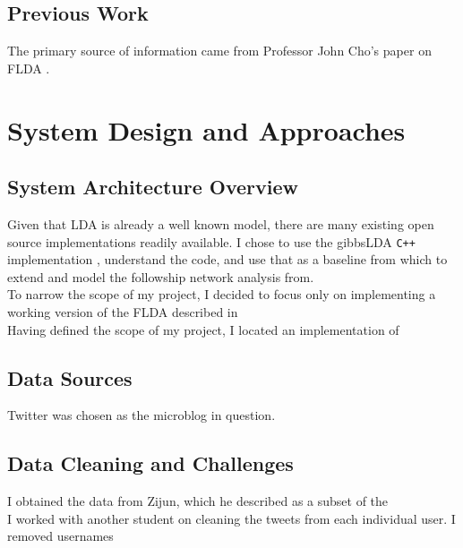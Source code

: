 \documentclass[a4paper]{article}
\begin{document}
\begin{multicols}{2}
\subsection{Previous Work}
The primary source of information came from Professor John Cho's paper on FLDA \cite{flda}.  \\

\section{System Design and Approaches}
\label{sec:approach}
\subsection{System Architecture Overview}
Given that LDA is already a well known model, there are many existing open source implementations readily available. I chose to use the gibbsLDA \verb!C++! implementation \cite{gibbs_lda}, understand the code, and use that as a baseline from which to extend and model the followship network analysis from. \\

To narrow the scope of my project, I decided to focus only on implementing a working version of the FLDA described in \\
Having defined the scope of my project, I 
located an implementation of  \cite{gibbs_lda}

\subsection{Data Sources}
Twitter was chosen as the microblog in question.

\subsection{Data Cleaning and Challenges}
I obtained the data from Zijun, which he described as a subset of the \\
I worked with another student on cleaning the tweets from each individual user. I removed usernames \\



\end{multicols}
\end{document}
